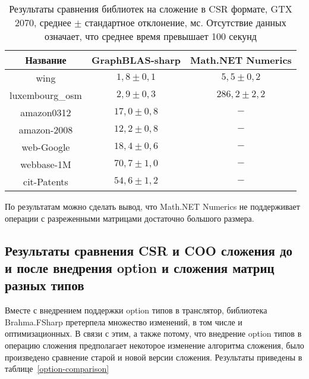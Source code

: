 \documentclass[14pt]{matmex-diploma-custom}
\begin{document}
\begin{table}
\centering
\begin{tabular}{|c||c|c|}
\hline
Название            & GraphBLAS-sharp & Math.NET Numerics     \\
\hline
\hline
wing            & $1,8 \pm 0,1$      & $5,5\pm 0,2$ \\
\hline
luxembourg\_osm & $2,9 \pm 0,3$       & $286,2\pm 2,2$ \\
\hline
amazon0312      & $17,0 \pm 0,8$     & $-$ \\
\hline
amazon-2008     & $12,2 \pm 0,8$    & $-$ \\
\hline
web-Google      & $18,4 \pm 0,6$      & $-$  \\
\hline
webbase-1M      & $70,7 \pm 1,0$      & $-$ \\
\hline
cit-Patents     & $54,6 \pm 1,2$      & $-$  \\       
\hline
\end{tabular}
\caption{Результаты сравнения библиотек на сложение в CSR формате, GTX 2070, среднее $\pm$ стандартное отклонение, мс. Отсутствие данных означает, что среднее время превышает 100 секунд}
\label{mathnet-comparison}
\end{table}

По результатам можно сделать вывод, что Math.NET Numerics не поддерживает операции с разреженными матрицами достаточно большого размера.

\subsection{Результаты сравнения CSR и COO сложения до и после внедрения option и сложения матриц разных типов}
\paagraph{}Вместе с внедрением поддержки option типов в транслятор, библиотека Brahma.FSharp претерпела множество изменений, в том числе и оптимизационных. В связи с этим, а также потому, что внедрение option типов в операцию сложения предполагает некоторое изменение алгоритма сложения, было произведено сравнение старой и новой версии сложения. Результаты приведены в таблице~\ref{option-comparison}
\end{document}

